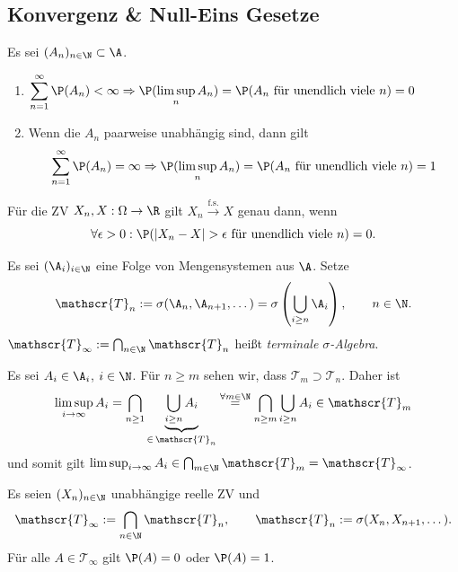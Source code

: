 \documentclass[11pt, a4paper]{article}
\begin{document}
\subsection{Konvergenz \& Null-Eins Gesetze}
\begin{theorem}\Theorem
    Es sei $(A_n)_{n \in \N} \subset \A$.
    \begin{enumerate}[label= \alph*)]
        \item $\displaystyle\sum_{n=1}^{\infty} \P(A_n) < \infty \Rightarrow \P(\limsup_n A_n) = \P(A_n \text{ für unendlich viele } n) = 0$
        \item Wenn die $A_n$ paarweise unabhängig sind, dann gilt
        $$\sum_{n=1}^{\infty} \P(A_n) = \infty \Rightarrow \P(\limsup_{n} A_n) = \P(A_n \text{ für unendlich viele } n) = 1$$
    \end{enumerate}
\end{theorem}

 
\begin{corollary}
    Für die ZV $X_n, X: \Omega \to \R$ gilt $X_n \xrightarrow{\text{f.s.}} X$ genau dann, wenn
    $$\forall \epsilon > 0: \P(|X_n - X| > \epsilon \text{ für unendlich viele } n) = 0.$$
\end{corollary}

\begin{definition} \Theorem
    Es sei $(\A_i)_{i \in \N}$ eine Folge von Mengensystemen aus $\A$. Setze
    $$\mathscr{T}_n := \sigma(\A_n, \A_{n+1}, \dots) = \sigma\left(\bigcup_{i \ge n} \A_i\right), \qquad n \in \N.$$
    $\mathscr{T}_\infty := \bigcap_{n \in \N} \mathscr{T}_n$ heißt \emph{terminale $\sigma$-Algebra}.
\end{definition}

\begin{example}
    Es sei $A_i \in \A_i$, $i \in \N$. Für $n \ge m$ sehen wir, dass $\mathscr{T}_m \supset \mathscr{T}_n$. Daher ist
    $$\limsup_{i \to \infty} A_i = \bigcap_{n \ge 1} \underbrace{\bigcup_{i \ge n} A_i}_{\in \, \mathscr{T}_n} \overset{\forall m \in \N}{=} \bigcap_{n \ge m} \bigcup_{i \ge n} A_i \in \mathscr{T}_m$$
    und somit gilt $\limsup_{i \to \infty} A_i \in \bigcap_{m \in \N} \mathscr{T}_m = \mathscr{T}_\infty$.
\end{example}


\begin{theorem}
    Es seien $(X_n)_{n \in \N}$ unabhängige reelle ZV und
    $$\mathscr{T}_\infty := \bigcap_{n \in \N} \mathscr{T}_n, \qquad \mathscr{T}_n := \sigma(X_n, X_{n+1}, \dots).$$
    Für alle $A \in \mathscr{T}_\infty$ gilt $\P(A) = 0$ oder $\P(A) = 1$.
\end{theorem}
\end{document}
